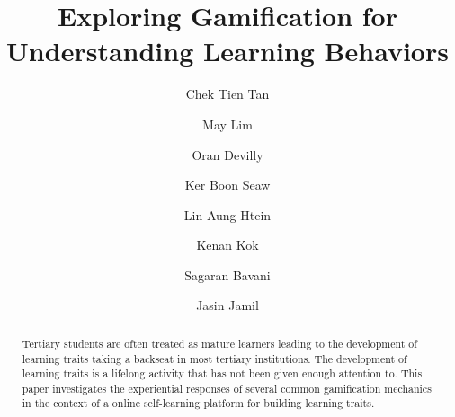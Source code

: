 \documentclass[manuscript,review,anonymous]{acmart}
\begin{document}
\title{Exploring Gamification for Understanding Learning Behaviors}


\author{Chek Tien Tan}

\author{May Lim}

\author{Oran Devilly}

\author{Ker Boon Seaw}

\author{Lin Aung Htein}

\author{Kenan Kok}

\author{Sagaran Bavani}

\author{Jasin Jamil}



\renewcommand{\shortauthors}{Tan, et al.}


\begin{abstract}
    Tertiary students are often treated as mature learners leading to the development of learning traits taking a backseat in most tertiary institutions.
    The development of learning traits is a lifelong activity that has not been given enough attention to.
    This paper investigates the experiential responses of several common gamification mechanics in the context of a online self-learning platform for building learning traits.

\end{abstract}
\end{document}
